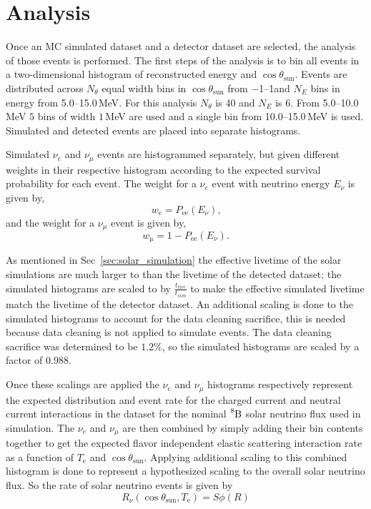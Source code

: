 \section{Analysis}
Once an MC simulated dataset and a detector dataset are selected, the analysis
of those events is performed.
The first steps of the analysis is to bin all events
in a two-dimensional histogram of reconstructed energy and $\cos\theta_{\mathrm{sun}}$.
Events are distributed across $N_{\theta}$ equal width bins in $\cos\theta_{\mathrm{sun}}$ from
\numrange{-1}{1}and
$N_{E}$ bins in energy from \numrange{5.0}{15.0}\,MeV.
For this analysis $N_{\theta}$ is 40 and $N_{E}$ is 6.
From \numrange{5.0}{10.0}\,MeV $5$ bins of width $1$\,MeV are used and
a single bin from \numrange{10.0}{15.0}\,MeV is used.
Simulated and detected events are placed into separate histograms.

Simulated $\nu_{e}$ and $\nu_{\mu}$ events are histogrammed separately,
but given different weights in their respective histogram according to the expected survival probability
for each event.
The weight for a $\nu_{e}$ event with neutrino energy $E_{\nu}$ is given by,
\begin{equation}
    w_{\mathrm{e}} = P_{\mathrm{ee}}(E_{\nu})\text{,}
\end{equation}
and the weight for a $\nu_{\mu}$ event is given by,
\begin{equation}
    w_{\mathrm{\mu}} = 1 - P_{\mathrm{ee}}(E_{\nu})\text{.}
\end{equation}

As mentioned in Sec~\ref{sec:solar_simulation}%
the effective livetime of the solar simulations are much larger to than
the livetime of the detected dataset; the simulated histograms are
scaled to by $\frac{t_{live}}{t_{sim}}$ to make the effective simulated
livetime match the livetime of the detector dataset.
An additional scaling is done to the simulated histograms to account
for the data cleaning sacrifice, this is needed because data cleaning
is not applied to simulate events.
The data cleaning sacrifice was determined to be $1.2\%$, so the
simulated histograms are scaled by a factor of $0.988$.

Once these scalings are applied the $\nu_{e}$ and $\nu_{\mu}$ histograms
respectively  represent the expected distribution and event rate for the charged current
and neutral current interactions in the dataset for the nominal $\ce{^{8}B}$
solar neutrino flux used in simulation.
The $\nu_{e}$ and $\nu_{\mu}$ are then combined by
simply adding their bin contents together to get the expected
flavor independent elastic scattering interaction rate as a function
of $T_{\mathrm{e}}$ and $\cos\theta_{\mathrm{sun}}$.
Applying additional scaling to this combined histogram is done to represent
a hypothesized scaling to the overall solar neutrino flux.
So the rate of solar neutrino events is given by
\begin{equation}
    R_{\nu}(\cos\theta_{\mathrm{sun}}, T_{\mathrm{e}}) =
    S\phi\left(R \right)
    \label{eqn:solar_rate}
\end{equation}


